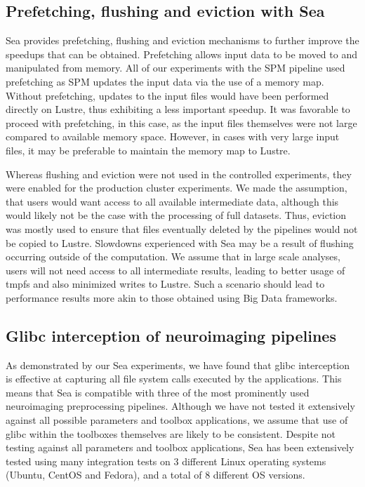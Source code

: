 \documentclass[pdflatex,sn-mathphys-num]{sn-jnl}
\theoremstyle{thmstyleone}%
\theoremstyle{thmstyletwo}%
\theoremstyle{thmstylethree}%
\begin{document}
    \subsection{Prefetching, flushing and eviction with Sea}

    Sea provides prefetching, flushing and eviction mechanisms to further
    improve the speedups that can be obtained. Prefetching allows input data to
    be moved to and manipulated from memory. All of our experiments with the SPM pipeline
    used prefetching as SPM updates the input data via the use of a memory map.
    Without prefetching, updates to the input files would have been performed
    directly on Lustre, thus exhibiting a less important speedup. It was
    favorable to proceed with prefetching, in this case, as the input files
    themselves were not large compared to available memory space. However, in
    cases with very large input files, it may be preferable to maintain the
    memory map to Lustre.

    Whereas flushing and eviction were not used in the controlled experiments,
    they were enabled for the production cluster experiments. We made the assumption, that
    users would want access to all available intermediate data, although this
    would likely not be the case with the processing of full datasets. Thus,
    eviction was mostly used to ensure that files eventually deleted by the
    pipelines would not be copied to Lustre. Slowdowns experienced with Sea may
    be a result of flushing occurring outside of the computation. We assume that
    in large scale analyses, users will not need access to all intermediate
    results, leading to better usage of tmpfs and also minimized writes to
    Lustre. Such a scenario should lead to performance results more akin to
    those obtained using Big Data frameworks.

    \subsection{Glibc interception of neuroimaging pipelines}
    
    As demonstrated by our Sea experiments, we have found that glibc interception
    is effective at capturing all file system calls executed by the
    applications. This means that Sea is compatible with three of the most
    prominently used neuroimaging preprocessing pipelines. Although we have not
    tested it extensively against all possible parameters and toolbox
    applications, we assume that use of glibc within the toolboxes themselves are
    likely to be consistent. Despite not testing against all parameters and
    toolbox applications, Sea has been extensively tested using many integration
    tests on 3 different Linux operating systems (Ubuntu, CentOS and Fedora),
    and a total of 8 different OS versions.
\end{document}
